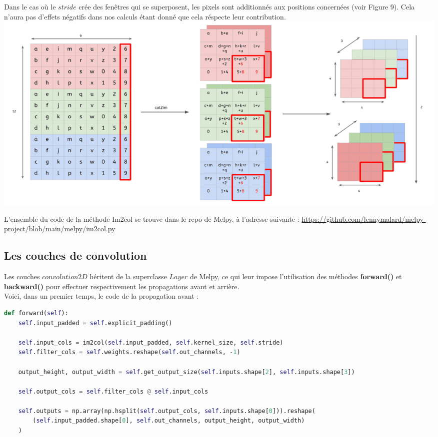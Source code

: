 \begin{multicols}{2}
Dans le cas où le $stride$ crée des fenêtres qui se superposent,
les pixels sont additionnés aux positions concernées (voir Figure 9). Cela n'aura pas 
d'effets négatifs dans nos calculs étant donné que cela réspecte leur 
contribution.\\

\includegraphics[width=\columnwidth]{images/im2col-4.png}
\hfill\break

L'ensemble du code de la méthode Im2col se trouve dans le repo de Melpy,
à l'adresse suivante : \url{https://github.com/lennymalard/melpy-project/blob/main/melpy/im2col.py}

\subsection{Les couches de convolution}

Les couches $convolution2D$ héritent de la superclasse $Layer$ 
de Melpy, ce qui leur impose l’utilisation des méthodes 
\textbf{forward()} et \textbf{backward()} pour effectuer 
respectivement les propagations avant et arrière.\\

Voici, dans un premier temps, le code de la propagation avant :\\

\begin{lstlisting}[language=Python]
def forward(self):
    self.input_padded = self.explicit_padding()

    self.input_cols = im2col(self.input_padded, self.kernel_size, self.stride)
    self.filter_cols = self.weights.reshape(self.out_channels, -1)

    output_height, output_width = self.get_output_size(self.inputs.shape[2], self.inputs.shape[3])

    self.output_cols = self.filter_cols @ self.input_cols

    self.outputs = np.array(np.hsplit(self.output_cols, self.inputs.shape[0])).reshape(
        (self.input_padded.shape[0], self.out_channels, output_height, output_width)
    )


\end{lstlisting}
\end{multicols}
